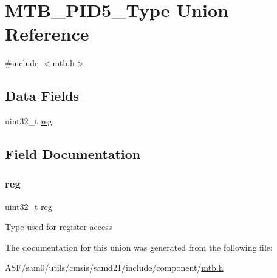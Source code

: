 \hypertarget{union_m_t_b___p_i_d5___type}{}\section{M\+T\+B\+\_\+\+P\+I\+D5\+\_\+\+Type Union Reference}
\label{union_m_t_b___p_i_d5___type}


{\ttfamily \#include $<$mtb.\+h$>$}

\subsection*{Data Fields}
\begin{DoxyCompactItemize}
\item 
uint32\+\_\+t \mbox{\hyperlink{union_m_t_b___p_i_d5___type_a6b91636401516a477989a336376d7b40}{reg}}
\end{DoxyCompactItemize}


\subsection{Field Documentation}
\mbox{\label{union_m_t_b___p_i_d5___type_a6b91636401516a477989a336376d7b40}} 
\subsubsection{\texorpdfstring{reg}{reg}}
{\footnotesize\ttfamily uint32\+\_\+t reg}

Type used for register access 

The documentation for this union was generated from the following file\+:\begin{DoxyCompactItemize}
\item 
A\+S\+F/sam0/utils/cmsis/samd21/include/component/\mbox{\hyperlink{component_2mtb_8h}{mtb.\+h}}\end{DoxyCompactItemize}
